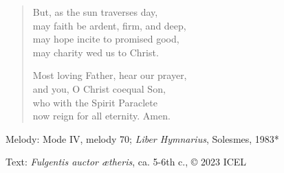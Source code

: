 \hymn



\setlength{\vleftmargin}{2em}
\begin{verse}
But, as the sun traverses day,\\
may faith be ardent, firm, and deep,\\
may hope incite to promised good,\\
may charity wed us to Christ.

Most loving Father, hear our prayer,\\
and you, O Christ coequal Son,\\
who with the Spirit Paraclete\\
now reign for all eternity. Amen.
\end{verse}
\setlength{\vleftmargin}{\defleftmargini}

\begin{hymnsource}
Melody: Mode IV, melody 70; \emph{Liber Hymnarius}, Solesmes, 1983*

Text: \emph{Fulgentis auctor ætheris}, ca. 5-6th c., © 2023 ICEL
\end{hymnsource}
